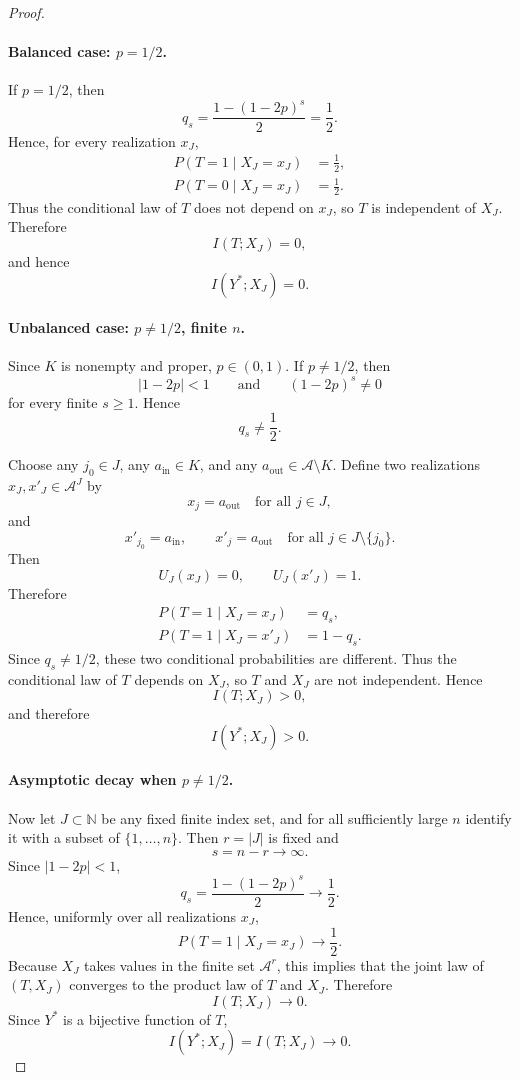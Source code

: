 \documentclass[fullpaper]{nldl}
\theoremstyle{plain}
\theoremstyle{definition}
\theoremstyle{remark}
\begin{document}
\begin{proof}
\paragraph{Balanced case: \(p=1/2\).}
If \(p=1/2\), then
\[
q_s = \frac{1-(1-2p)^s}{2} = \frac{1}{2}.
\]
Hence, for every realization \(x_J\),
\[
\begin{aligned}
P(T=1\mid X_J=x_J)&=\tfrac12,\\
P(T=0\mid X_J=x_J)&=\tfrac12.
\end{aligned}
\]
Thus the conditional law of \(T\) does not depend on \(x_J\), so \(T\) is independent
of \(X_J\). Therefore
\[
I(T;X_J)=0,
\]
and hence
\[
I(Y^*;X_J)=0.
\]

\paragraph{Unbalanced case: \(p\neq 1/2\), finite \(n\).}
Since \(K\) is nonempty and proper, \(p\in(0,1)\). If \(p\neq 1/2\), then
\[
|1-2p|<1
\qquad\text{and}\qquad
(1-2p)^s \neq 0
\]
for every finite \(s\ge 1\). Hence
\[
q_s \neq \frac12.
\]

Choose any \(j_0\in J\), any \(a_{\mathrm{in}}\in K\), and any
\(a_{\mathrm{out}}\in \mathcal A\setminus K\). Define two realizations
\(x_J,x'_J\in \mathcal A^J\) by
\[
x_j = a_{\mathrm{out}} \quad \text{for all } j\in J,
\]
and
\[
x'_{j_0}=a_{\mathrm{in}},
\qquad
x'_j=a_{\mathrm{out}} \quad \text{for all } j\in J\setminus\{j_0\}.
\]
Then
\[
U_J(x_J)=0,
\qquad
U_J(x'_J)=1.
\]
Therefore
\[
\begin{aligned}
P(T=1\mid X_J=x_J)&=q_s,\\
P(T=1\mid X_J=x'_J)&=1-q_s.
\end{aligned}
\]
Since \(q_s\neq 1/2\), these two conditional probabilities are different. Thus the
conditional law of \(T\) depends on \(X_J\), so \(T\) and \(X_J\) are not independent.
Hence
\[
I(T;X_J)>0,
\]
and therefore
\[
I(Y^*;X_J)>0.
\]

\paragraph{Asymptotic decay when \(p\neq 1/2\).}
Now let \(J\subset\mathbb N\) be any fixed finite index set, and for all sufficiently large
\(n\) identify it with a subset of \(\{1,\ldots,n\}\). Then \(r=|J|\) is fixed and
\[
s=n-r \to \infty.
\]
Since \(|1-2p|<1\),
\[
q_s = \frac{1-(1-2p)^s}{2} \to \frac12.
\]
Hence, uniformly over all realizations \(x_J\),
\[
P(T=1\mid X_J=x_J)\to \frac12.
\]
Because \(X_J\) takes values in the finite set \(\mathcal A^r\), this implies that the joint
law of \((T,X_J)\) converges to the product law of \(T\) and \(X_J\). Therefore
\[
I(T;X_J)\to 0.
\]
Since \(Y^*\) is a bijective function of \(T\),
\[
I(Y^*;X_J)=I(T;X_J)\to 0.
\]


\end{proof}
\end{document}
